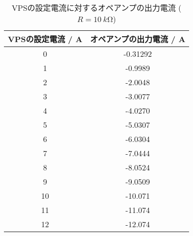 \begin{table}[!htp]\centering
	\caption{VPSの設定電流に対するオペアンプの出力電流 ($R=\SI{10}{k\ohm}$)}\label{tab:exp3-10k}
	\scriptsize
	\begin{tabular}{cc}\toprule
		VPSの設定電流 / \si{A} & オペアンプの出力電流 / \si{A} \\\midrule
		0                 & -0.31292            \\
		1                 & -0.9989             \\
		2                 & -2.0048             \\
		3                 & -3.0077             \\
		4                 & -4.0270             \\
		5                 & -5.0307             \\
		6                 & -6.0304             \\
		7                 & -7.0444             \\
		8                 & -8.0524             \\
		9                 & -9.0509             \\
		10                & -10.071             \\
		11                & -11.074             \\
		12                & -12.074             \\
		\bottomrule
	\end{tabular}
\end{table}
